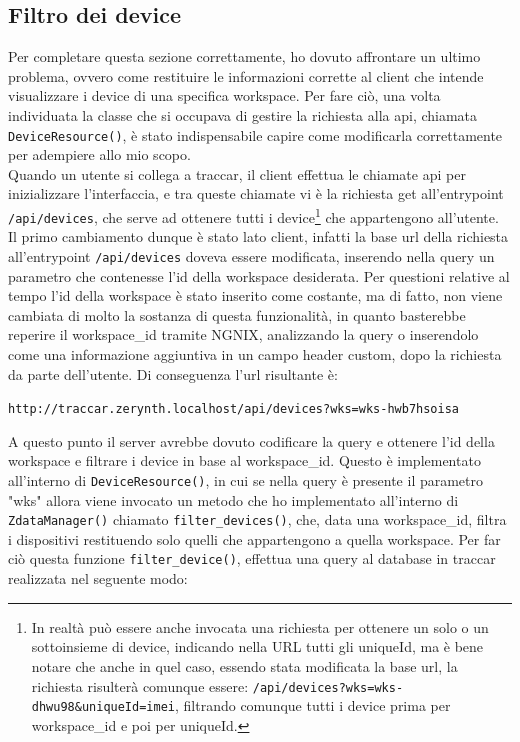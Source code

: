 \documentclass[a4paper,titlepage,12pt]{book}
\begin{document}
{\subsection{ 
Filtro dei device}
Per completare questa sezione correttamente, ho dovuto affrontare un ultimo problema, ovvero come restituire le informazioni corrette al client che intende visualizzare i device di una specifica workspace. Per fare ciò, una volta individuata la classe che si occupava di gestire la richiesta alla api, chiamata \texttt{DeviceResource()}, è stato indispensabile capire come modificarla correttamente per adempiere allo mio scopo.\\
Quando un utente si collega a traccar, il client effettua le chiamate api per inizializzare l'interfaccia, e tra queste chiamate vi è la richiesta get all'entrypoint \texttt{/api/devices}, che serve ad ottenere tutti i device\footnote{In realtà può essere anche invocata una richiesta per ottenere un solo o un sottoinsieme di device, indicando nella URL tutti gli uniqueId, ma è bene notare che anche in quel caso, essendo stata modificata la base url, la richiesta risulterà comunque essere: \texttt{/api/devices?wks=wks-dhwu98\&uniqueId=imei}, filtrando comunque tutti i device prima per workspace\_id e poi per uniqueId.} che appartengono all'utente.\\
Il primo cambiamento dunque è stato lato client, infatti la base url della richiesta all'entrypoint \texttt{/api/devices} doveva essere modificata, inserendo nella query un parametro che contenesse l'id della workspace desiderata. Per questioni relative al tempo l'id della workspace è stato inserito come costante, ma di fatto, non viene cambiata di molto la sostanza di questa funzionalità, in quanto basterebbe reperire il workspace\_id tramite NGNIX, analizzando la query o inserendolo come una informazione aggiuntiva in un campo header custom, dopo la richiesta da parte dell'utente. Di conseguenza l'url risultante è:\par\medskip
\texttt{http://traccar.zerynth.localhost/api/devices?wks=wks-hwb7hsoisa}\par\medskip

A questo punto il server avrebbe dovuto codificare la query e ottenere l'id della workspace e filtrare i device in base al workspace\_id. Questo è implementato all'interno di \texttt{DeviceResource()}, in cui se nella query è presente il parametro "wks" allora viene invocato un metodo che ho implementato all'interno di \texttt{ZdataManager()} chiamato \texttt{filter\_devices()}, che, data una workspace\_id, filtra i dispositivi restituendo solo quelli che appartengono a quella workspace. Per far ciò questa funzione \texttt{filter\_device()}, effettua una query al database in traccar realizzata nel seguente modo:

}
\end{document}
